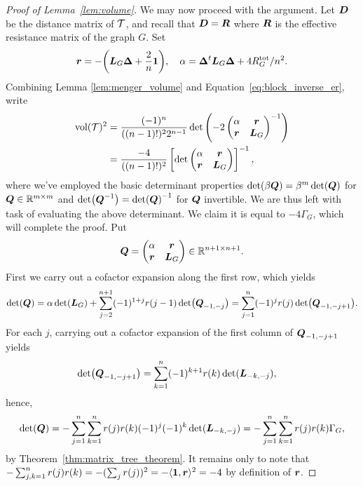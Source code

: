 \begin{proof}[Proof of Lemma~\ref{lem:volume}]
	We may now proceed  with the argument. 
	Let $\vb*{D}$ be the distance matrix of $\mathcal{T}$, and recall that $\vb*{D}=\vb*{R}$ where $\vb*{R}$ is the effective resistance matrix of the graph $G$. 
	Set \[\vb*{r}=-\bigg(\vb*{L}_G\vb*{\Delta} + \frac{2}{n}\vb{1}\bigg), \quad \alpha = \vb*{\Delta}^t \vb*{L}_G\vb*{\Delta} + 4R^{\textnormal{tot}}_G/n^2.\] 
	Combining Lemma \ref{lem:menger_volume} and Equation~\eqref{eq:block_inverse_er}, write 
	\begin{align*}
	\textnormal{vol}(\mathcal{T})^2 &= \frac{(-1)^n }{((n-1)!)^2 2^{n-1}} \det\left(-2\begin{pmatrix}
	\alpha & \vb*{r} \\
	\vb*{r} & \vb*{L}_G
	\end{pmatrix}^{-1}\right) \\
	&= \frac{ -4}{((n-1)!)^2}\left[\det\begin{pmatrix}
	\alpha & \vb*{r} \\
	\vb*{r} & \vb*{L}_G
	\end{pmatrix}\right]^{-1},
	\end{align*}
	where we've employed the basic determinant properties $\det( \beta\vb*{Q})=\beta^{m}\det(\vb*{Q})$ for $\vb*{Q}\in\mathbb{R}^{m\times m}$ and $\det(\vb*{Q}^{-1})=\det(\vb*{Q})^{-1}$ for $\vb*{Q}$ invertible. We are thus left with task of evaluating the above determinant. We claim it is equal to $-4\Gamma_G$,  which will complete the proof. 
	Put 
	\[\vb*{Q} = \begin{pmatrix}
	\alpha & \vb*{r}\\ \vb*{r}& \vb*{L}_G
	\end{pmatrix}\in\mathbb{R}^{n+1\times n+1}.\]
	First we carry out a cofactor expansion along the first row, which yields 
	\begin{align*}
	\det(\vb*{Q}) = \alpha \det(\vb*{L}_G) + \sum_{j=2}^{n+1}(-1)^{1+j}r({j-1}) \det(\vb*{Q}_{-1,-j}) = \sum_{j=1}^n (-1)^j r(j) \det(\vb*{Q}_{-1,-j+1}).
	\end{align*}
	For each $j$, carrying out a cofactor expansion of the first column of $\vb*{Q}_{-1,-j+1}$ yields 
	\begin{align*}
	\det(\vb*{Q}_{-1,-j+1}) &= \sum_{k=1}^n (-1)^{k+1}r(k) \det(\vb*{L}_{-k,-j}),
	\end{align*}
	hence, 
	\begin{align*}
	\det(\vb*{Q}) = - \sum_{j=1}^n \sum_{k=1}^n r(j)r(k)(-1)^j(-1)^k  \det(\vb*{L}_{-k,-j}) = - \sum_{j=1}^n \sum_{k=1}^n r(j)r(k)\Gamma_G,
	\end{align*}
	by Theorem~\ref{thm:matrix_tree_theorem}. It remains only to note that 
	$-\sum_{j,k=1}^n r(j) r(k) = -(\sum_j r(j))^2 = - \langle \vb{1},\vb*{r}\rangle ^2 = - 4$ 
	by  definition  of $\vb*{r}$. 
\end{proof}

